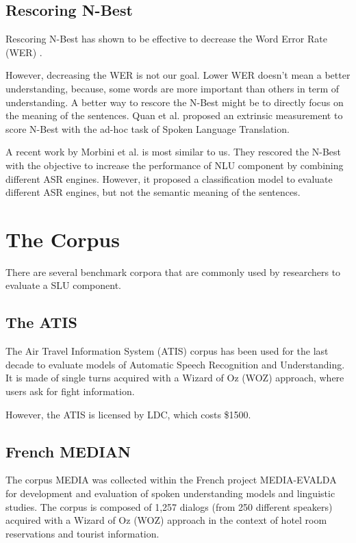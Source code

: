 \documentclass[11pt,letterpaper]{article}
\begin{document}
\subsection{Rescoring N-Best}
Rescoring N-Best has shown to be effective to decrease the Word Error Rate (WER) \cite{Zhang:2004,Zhou:2006}.

However, decreasing the WER is not our goal. Lower WER doesn't mean a better understanding, because, some words are more important than others in term of understanding. A better way to rescore the N-Best might be to directly focus on the meaning of the sentences. Quan et al.  proposed an extrinsic measurement to score N-Best with the ad-hoc task of Spoken Language Translation.

A recent work by Morbini et al.  is most similar to us. They rescored the N-Best with the objective to increase the performance of NLU component by combining different ASR engines. However, it proposed a classification model to evaluate different ASR engines, but not the semantic meaning of the sentences.

\section{The Corpus}

There are several benchmark corpora that are commonly used by researchers to evaluate a SLU component.

\subsection{The ATIS}
The Air Travel Information System (ATIS) corpus \cite{Dahl:1994} has been used for the last decade to evaluate models of Automatic Speech Recognition and Understanding. It is made of single turns acquired with a Wizard of Oz (WOZ) approach, where users ask for fight information.

However, the ATIS is licensed by LDC, which costs \$1500.

\subsection{French MEDIAN}

The corpus MEDIA was collected within the French project MEDIA-EVALDA \cite{Bonneau-Maynard:2006} for development and evaluation of spoken understanding models and linguistic studies. The corpus is composed of 1,257 dialogs (from 250 different speakers) acquired with a Wizard of Oz (WOZ) approach in the context of hotel room reservations and tourist information.
\end{document}
